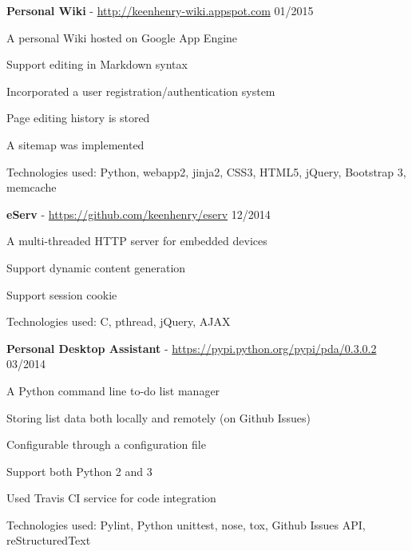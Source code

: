 \documentclass[margin,line]{resume}
\begin{document}
\begin{resume}
    \textbf{Personal Wiki} - \url{http://keenhenry-wiki.appspot.com} \hfill 01/2015 \vspace{-3mm}\\\vspace{-1mm}%
      \begin{list2}
       \item A personal Wiki hosted on Google App Engine
       \item Support editing in Markdown syntax
       \item Incorporated a user registration/authentication system
       \item Page editing history is stored
       \item A sitemap was implemented
       \item Technologies used: Python, webapp2, jinja2, CSS3, HTML5, jQuery, Bootstrap 3, memcache
      \end{list2}

    \textbf{eServ} - \url{https://github.com/keenhenry/eserv} \hfill 12/2014 \vspace{-3mm}\\\vspace{-1mm}%
      \begin{list2}
       \item A multi-threaded HTTP server for embedded devices
       \item Support dynamic content generation
       \item Support session cookie
       \item Technologies used: C, pthread, jQuery, AJAX
      \end{list2}

    \textbf{Personal Desktop Assistant} - \url{https://pypi.python.org/pypi/pda/0.3.0.2} \hfill 03/2014 \vspace{-3mm}\\\vspace{-1mm}%
      \begin{list2}
       \item A Python command line to-do list manager
       \item Storing list data both locally and remotely (on Github Issues)
       \item Configurable through a configuration file
       \item Support both Python 2 and 3
       \item Used Travis CI service for code integration
       \item Technologies used: Pylint, Python unittest, nose, tox, Github Issues API, reStructuredText
      \end{list2}


\end{resume}
\end{document}
